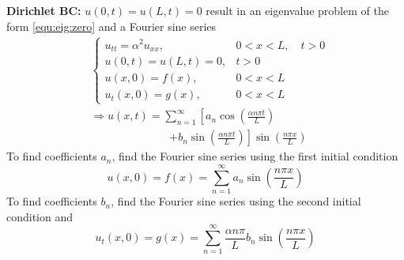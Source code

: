 \documentclass[10pt,leqno]{article}
\begin{document}
\begin{multicols}{2}
    
\textbf{Dirichlet BC:} $u(0,t) = u(L,t)= 0$ result in an eigenvalue pro\-blem of the form \eqref{equ:eig:zero} and a Fourier sine series
\begin{align}
    & \left\{ \begin{array}{ll}
            u_{tt} = \alpha^{2} u_{xx}, & 0<x<L, \quad t>0 \\
            u(0,t) = u(L,t)= 0, & t>0 \\
            u(x,0) = f(x), & 0<x<L \\
            u_{t}(x,0) = g(x), & 0<x<L
    \end{array}\right. \label{equ:wave:dirichlet} \\
    & \Rightarrow u(x,t)= \sum_{n=1}^{\infty}\left[ a_{n}\cos\left( \frac{\alpha n\pi t}{L} \right) \right. \\
    & \hspace{3cm} \left. + b_{n}\sin\left( \frac{\alpha n\pi t}{L} \right) \right] \sin\left(\frac{n\pi x}{L}\right) \nonumber
\end{align}
To find coefficients $a_{n}$, find the Fourier sine series using the first initial condition
\begin{equation}
    u(x,0)=f(x)=\sum_{n=1}^{\infty} a_{n} \sin \left(\frac{n\pi x}{L}\right)
\end{equation}
To find coefficients $b_{n}$, find the Fourier sine series using the second initial condition and 
\begin{equation}
    u_{t}(x,0)=g(x)=\sum_{n=1}^{\infty} \frac{\alpha n\pi}{L} b_{n} \sin \left(\frac{n\pi x}{L}\right)
\end{equation}



\end{multicols}
\end{document}
